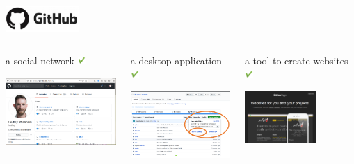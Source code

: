 \begin{frame}{\includegraphics[height=1cm]{shared/logo-github.png}}
\begin{columns}
\begin{block}{a social network \includegraphics[height=0.3cm]{05_history/Images/FAIR_yes.png}}
\begin{center}
\includegraphics[height=2.6cm]{05_history/Images/FAIR_github_exSocialNet.png}
\end{center}
\end{block}
\begin{block}{a desktop application \includegraphics[height=0.3cm]{05_history/Images/FAIR_yes.png}}
\begin{center}
\includegraphics[height=2.6cm]{05_history/Images/FAIR_github_desktop_dl.png}
\end{center}
\end{block}
\begin{block}{a tool to create websites \includegraphics[height=0.3cm]{05_history/Images/FAIR_yes.png}}
\begin{center}
\includegraphics[height=2cm]{05_history/Images/FAIR_github_pages.png}

\end{center}
\end{block}
\end{columns}
\end{frame}
